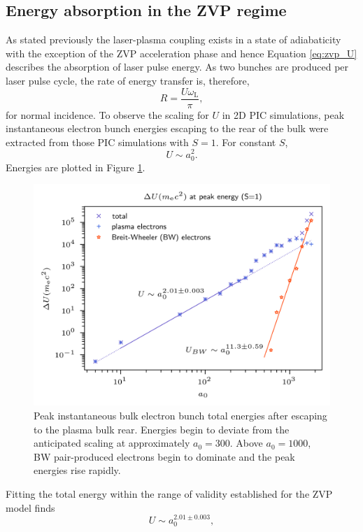 \subsection{Energy absorption in the ZVP regime}\label{sec:zvp-energyabsorption}
As stated previously the laser-plasma coupling exists in a state of adiabaticity with the exception of the ZVP acceleration phase and hence Equation \ref{eq:zvp_U} describes the absorption of laser pulse energy. As two bunches are produced per laser pulse cycle, the rate of energy transfer is, therefore,
\begin{equation}\label{eq:zvp-rate}
	R = \frac{U\omega_\mathrm{L}}{\pi},
\end{equation}
for normal incidence. To observe the scaling for $U$ in 2D PIC simulations, peak instantaneous electron bunch energies escaping to the rear of the bulk were extracted from those PIC simulations with $S=1$. For constant $S$, 
\begin{equation}
	U \sim a^2_0.
\end{equation}
Energies are plotted in Figure \ref{fig:zvppeakgamma}.
\begin{figure}
	\centering
	\includegraphics[width=0.7\linewidth]{figures/zvp/zvp_peak_gamma}
	\caption[Peak instantaneous bulk electron bunch total energy escaping to the plasma bulk rear.]{Peak instantaneous bulk electron bunch total energies after escaping to the plasma bulk rear. Energies begin to deviate from the anticipated scaling at approximately $a_0 = 300$. Above $a_0 = 1000$, BW pair-produced electrons begin to dominate and the peak energies rise rapidly.}
	\label{fig:zvppeakgamma}
\end{figure}
Fitting the total energy within the range of validity established for the ZVP model finds
\begin{equation}
	U \sim a^{2.01\pm0.003}_0,
\end{equation}
